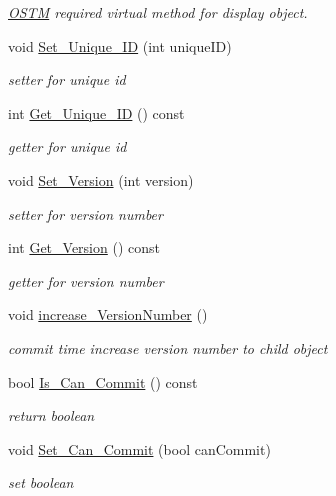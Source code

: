 \begin{DoxyCompactItemize}
\begin{DoxyCompactList}\small\item\em \hyperlink{class_o_s_t_m}{O\+S\+TM} required virtual method for display object. \end{DoxyCompactList}\item 
void \hyperlink{class_o_s_t_m_ab5019a32185631c08abbf826422f2d93}{Set\+\_\+\+Unique\+\_\+\+ID} (int unique\+ID)
\begin{DoxyCompactList}\small\item\em setter for unique id \end{DoxyCompactList}\item 
int \hyperlink{class_o_s_t_m_a5a01a8b98d16b1d1904ecf9356e7b71d}{Get\+\_\+\+Unique\+\_\+\+ID} () const 
\begin{DoxyCompactList}\small\item\em getter for unique id \end{DoxyCompactList}\item 
void \hyperlink{class_o_s_t_m_a9529ad8d6d28c1f0cc9b86ed91df1ae1}{Set\+\_\+\+Version} (int version)
\begin{DoxyCompactList}\small\item\em setter for version number \end{DoxyCompactList}\item 
int \hyperlink{class_o_s_t_m_a1f1db9d482f22c8e7caa17dfb340626b}{Get\+\_\+\+Version} () const 
\begin{DoxyCompactList}\small\item\em getter for version number \end{DoxyCompactList}\item 
void \hyperlink{class_o_s_t_m_a5f90caa4384d371c16b7cac860d9f89a}{increase\+\_\+\+Version\+Number} ()
\begin{DoxyCompactList}\small\item\em commit time increase version number to child object \end{DoxyCompactList}\item 
bool \hyperlink{class_o_s_t_m_a8df39ced3b401aa466df97e26d14b1b7}{Is\+\_\+\+Can\+\_\+\+Commit} () const 
\begin{DoxyCompactList}\small\item\em return boolean \end{DoxyCompactList}\item 
void \hyperlink{class_o_s_t_m_a813ee61c9d1c83c6a6ae30d12aca8a5d}{Set\+\_\+\+Can\+\_\+\+Commit} (bool can\+Commit)
\begin{DoxyCompactList}\small\item\em set boolean \end{DoxyCompactList}\item 

\end{DoxyCompactItemize}
